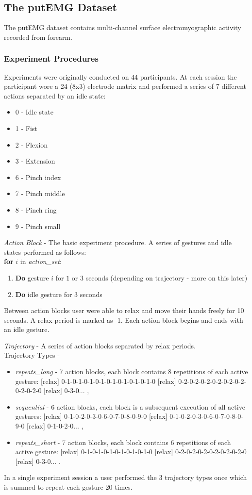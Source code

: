 \documentclass[fourier]{_style/dissertation}
\begin{document}
\subsection{The putEMG Dataset}
The putEMG dataset \cite{Kaczmarek2019PutEMGADataset} contains multi-channel surface electromyographic activity recorded from forearm. 
\subsubsection{Experiment Procedures}
Experiments were originally conducted on 44 participants. At each session the participant wore a 24 (8x3) electrode matrix and performed a series of 7 different actions separated by an idle state:
\begin{itemize}
    \item 0 - Idle state
    \item 1 - Fist
    \item 2 - Flexion
    \item 3 - Extension
    \item 6 - Pinch index
    \item 7 - Pinch middle
    \item 8 - Pinch ring
    \item 9 - Pinch small
\end{itemize}

\textit{Action Block} - The basic experiment procedure. A series of gestures and idle states performed as follows:\\

\textbf{for} $i$ in \textit{action\_set}:
\begin{enumerate}
    \item  \textbf{Do} gesture $i$ for $1$ or $3$ seconds (depending on trajectory - more on this later)
    \item   \textbf{Do} idle gesture for $3$ seconds
\end{enumerate}
 Between action blocks user were able to relax and move their hands freely for 10 seconds. A relax period is marked as -1. Each action block begins and ends with an idle gesture.

\textit{Trajectory} - A series of action blocks separated by relax periods.\\
Trajectory Types - 
\begin{itemize}
    \item \textit{repeats\_long} - 7 action blocks, each block contains 8 repetitions of each active gesture: [relax] 0-1-0-1-0-1-0-1-0-1-0-1-0-1-0-1-0 [relax] 0-2-0-2-0-2-0-2-0-2-0-2-0-2-0-2-0 [relax] 0-3-0... ,
    \item \textit{sequential} - 6 action blocks, each block is a subsequent execution of all active gestures: [relax] 0-1-0-2-0-3-0-6-0-7-0-8-0-9-0 [relax] 0-1-0-2-0-3-0-6-0-7-0-8-0-9-0 [relax] 0-1-0-2-0... ,
    \item \textit{repeats\_short} - 7 action blocks, each block contains 6 repetitions of each active gesture: [relax] 0-1-0-1-0-1-0-1-0-1-0-1-0 [relax] 0-2-0-2-0-2-0-2-0-2-0-2-0 [relax] 0-3-0... .
\end{itemize}
In a single experiment session a user performed the 3 trajectory types once which is summed to repeat each gesture 20 times.
\end{document}
